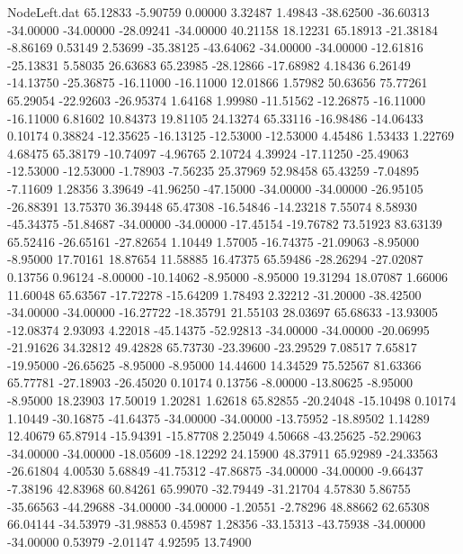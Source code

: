 \begin{filecontents}{NodeLeft.dat}
  65.12833   -5.90759    0.00000     3.32487    1.49843  -38.62500  -36.60313  -34.00000  -34.00000  -28.09241  -34.00000   40.21158   18.12231
  65.18913  -21.38184   -8.86169     0.53149    2.53699  -35.38125  -43.64062  -34.00000  -34.00000  -12.61816  -25.13831    5.58035   26.63683
  65.23985  -28.12866  -17.68982     4.18436    6.26149  -14.13750  -25.36875  -16.11000  -16.11000   12.01866    1.57982   50.63656   75.77261
  65.29054  -22.92603  -26.95374     1.64168    1.99980  -11.51562  -12.26875  -16.11000  -16.11000    6.81602   10.84373   19.81105   24.13274
  65.33116  -16.98486  -14.06433     0.10174    0.38824  -12.35625  -16.13125  -12.53000  -12.53000    4.45486    1.53433    1.22769    4.68475
  65.38179  -10.74097   -4.96765     2.10724    4.39924  -17.11250  -25.49063  -12.53000  -12.53000   -1.78903   -7.56235   25.37969   52.98458
  65.43259   -7.04895   -7.11609     1.28356    3.39649  -41.96250  -47.15000  -34.00000  -34.00000  -26.95105  -26.88391   13.75370   36.39448
  65.47308  -16.54846  -14.23218     7.55074    8.58930  -45.34375  -51.84687  -34.00000  -34.00000  -17.45154  -19.76782   73.51923   83.63139
  65.52416  -26.65161  -27.82654     1.10449    1.57005  -16.74375  -21.09063   -8.95000   -8.95000   17.70161   18.87654   11.58885   16.47375
  65.59486  -28.26294  -27.02087     0.13756    0.96124   -8.00000  -10.14062   -8.95000   -8.95000   19.31294   18.07087    1.66006   11.60048
  65.63567  -17.72278  -15.64209     1.78493    2.32212  -31.20000  -38.42500  -34.00000  -34.00000  -16.27722  -18.35791   21.55103   28.03697
  65.68633  -13.93005  -12.08374     2.93093    4.22018  -45.14375  -52.92813  -34.00000  -34.00000  -20.06995  -21.91626   34.32812   49.42828
  65.73730  -23.39600  -23.29529     7.08517    7.65817  -19.95000  -26.65625   -8.95000   -8.95000   14.44600   14.34529   75.52567   81.63366
  65.77781  -27.18903  -26.45020     0.10174    0.13756   -8.00000  -13.80625   -8.95000   -8.95000   18.23903   17.50019    1.20281    1.62618
  65.82855  -20.24048  -15.10498     0.10174    1.10449  -30.16875  -41.64375  -34.00000  -34.00000  -13.75952  -18.89502    1.14289   12.40679
  65.87914  -15.94391  -15.87708     2.25049    4.50668  -43.25625  -52.29063  -34.00000  -34.00000  -18.05609  -18.12292   24.15900   48.37911
  65.92989  -24.33563  -26.61804     4.00530    5.68849  -41.75312  -47.86875  -34.00000  -34.00000   -9.66437   -7.38196   42.83968   60.84261
  65.99070  -32.79449  -31.21704     4.57830    5.86755  -35.66563  -44.29688  -34.00000  -34.00000   -1.20551   -2.78296   48.88662   62.65308
  66.04144  -34.53979  -31.98853     0.45987    1.28356  -33.15313  -43.75938  -34.00000  -34.00000    0.53979   -2.01147    4.92595   13.74900

\end{filecontents}
